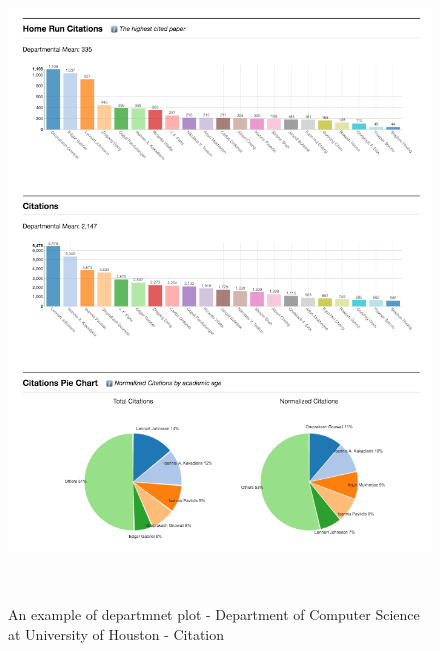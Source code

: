\begin{figure}
  \centering
  \includegraphics[width=1\textwidth]{figures/Dept-Cit}
  \caption{An example of departmnet plot - Department of Computer Science at University of Houston - Citation}~\label{fig:DP-College1}
\end{figure}


